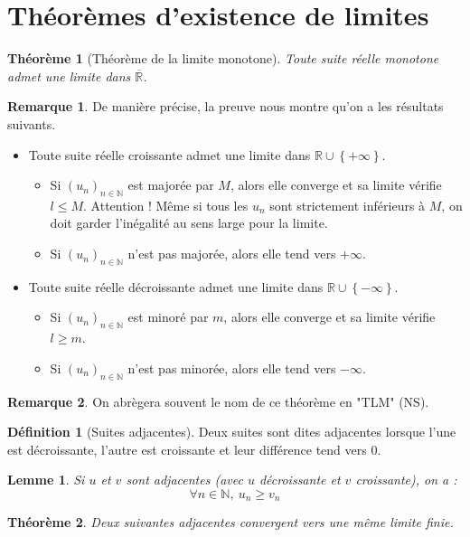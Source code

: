 \documentclass[french]{book}
\newcommand{\N}{\mathbb{N}}
\newcommand{\R}{\mathbb{R}}
\theoremstyle{plain}
\newtheorem{thm}{Théorème}[chapter]
\newtheorem{lem}{Lemme}[chapter]
\theoremstyle{definition}
\newtheorem{dfn}{Définition}[chapter]
\newtheorem{rmq}{Remarque}[chapter]
\theoremstyle{remark}
\begin{document}
\section{Théorèmes d'existence de limites}
\begin{thm}[Théorème de la limite monotone]
	Toute suite réelle monotone admet une limite dans $\overline{\R}$.
\end{thm}
\begin{rmq}
	De manière précise, la preuve nous montre qu'on a les résultats suivants.
	\begin{itemize}
		\item Toute suite réelle croissante admet une limite dans $\R\cup\left\{+\infty\right\}$.
		\begin{itemize}
			\item Si $(u_n)_{n\in\N}$ est majorée par $M$, alors elle converge et sa limite vérifie $l\leqslant M$. Attention ! Même si tous les $u_n$ sont strictement inférieurs à $M$, on doit garder l'inégalité au sens large pour la limite.
			\item Si $(u_n)_{n\in\N}$ n'est pas majorée, alors elle tend vers $+\infty$.
		\end{itemize}
		\item Toute suite réelle décroissante admet une limite dans $\R\cup\left\{-\infty\right\}$.
		\begin{itemize}
			\item Si $(u_n)_{n\in\N}$ est minoré par $m$, alors elle converge et sa limite vérifie $l\geqslant m$.
			\item Si $(u_n)_{n\in\N}$ n'est pas minorée, alors elle tend vers $-\infty$.
		\end{itemize}
	\end{itemize}
\end{rmq}
\begin{rmq}
	On abrègera souvent le nom de ce théorème en "TLM" (NS).
\end{rmq}
\begin{dfn}[Suites adjacentes]
	Deux suites sont dites adjacentes lorsque l'une est décroissante, l'autre est croissante et leur différence tend vers $0$.
\end{dfn}
\begin{lem}
	Si $u$ et $v$ sont adjacentes (avec $u$ décroissante et $v$ croissante), on a : $$\forall n \in\N,\ u_n\geqslant v_n$$
\end{lem}
\begin{thm}
	Deux suivantes adjacentes convergent vers une même limite finie.
\end{thm}
\end{document}
